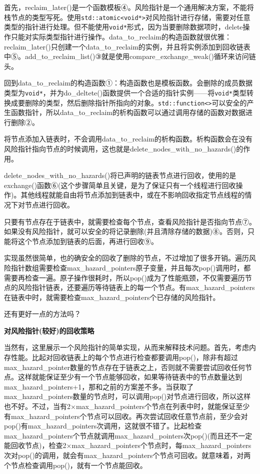 首先，reclaim\_later()是一个函数模板④。风险指针是一个通用解决方案，不能将栈节点的类型写死。使用\texttt{std::atomic<void*>}对风险指针进行存储，需要对任意类型的指针进行处理。但不能使用\texttt{void*}形式，因为当要删除数据项时，delete操作只能对实际类型指针进行操作。data\_to\_reclaim的构造函数就很优雅：reclaim\_later()只创建一个data\_to\_reclaim的实例，并且将实例添加到回收链表中⑤。add\_to\_reclaim\_list()③就是使用compare\_exchange\_weak()循环来访问链头。

回到data\_to\_reclaim的构造函数①：构造函数也是模板函数。会删除的成员数据类型为\texttt{void*}，并为do\_deltete()函数提供一个合适的指针实例——将\texttt{void*}类型转换成要删除的类型，然后删除指针所指向的对象。\texttt{std::function<>}可以安全的产生函数指针，所以data\_to\_reclaim的析构函数可以通过调用存储的函数对数据进行删除②。

将节点添加入链表时，不会调用data\_to\_reclaim的析构函数。析构函数会在没有风险指针指向节点的时候调用，这也就是delete\_nodes\_with\_no\_hazards()的作用。

delete\_nodes\_with\_no\_hazards()将已声明的链表节点进行回收，使用的是exchange()函数⑥(这个步骤简单且关键，是为了保证只有一个线程进行回收操作)。其他线程就能自由将节点添加到链表中，或在不影响回收指定节点线程的情况下对节点进行回收。

只要有节点存在于链表中，就需要检查每个节点，查看风险指针是否指向节点⑦。如果没有风险指针，就可以安全的将记录删除(并且清除存储的数据)⑧。否则，只能将这个节点添加到链表的后面，再进行回收⑨。

实现虽然很简单，也的确安全的回收了删除的节点，不过增加了很多开销。遍历风险指针数组需要检查max\_hazard\_pointers原子变量，并且每次pop()调用时，都需要再检查一遍。原子操作很耗时，所以pop()成为了性能瓶颈，不仅需要遍历节点的风险指针链表，还要遍历等待链表上的每一个节点。有max\_hazard\_pointers在链表中时，就需要检查max\_hazard\_pointers个已存储的风险指针。

还有更好一点的方法吗？

\textbf{对风险指针(较好)的回收策略}

当然有，这里展示一个风险指针的简单实现，从而来解释技术问题。首先，考虑内存性能。比起对回收链表上的每个节点进行检查都要调用pop()，除非有超过max\_hazard\_pointer数量的节点存在于链表之上，否则就不需要尝试回收任何节点。这样就能保证至少有一个节点能够回收，如果等待链表中的节点数量达到max\_hazard\_pointers+1，那和之前的方案差不多。当获取了max\_hazard\_pointers数量的节点时，可以调用pop()对节点进行回收，所以这样也不好。不过，当有2×max\_hazard\_pointers个节点在列表中时，就能保证至少有max\_hazard\_pointers个节点可以回收。再次尝试回收任意节点前，至少会对pop()有max\_hazard\_pointers次调用，这就很不错了。比起检查max\_hazard\_pointers个节点就调用max\_hazard\_pointers次pop()(而且还不一定能回收节点)，检查2×max\_hazard\_pointers个节点时，每max\_hazard\_pointers次对pop()的调用，就会有max\_hazard\_pointers个节点可回收。就意味着，对两个节点检查调用pop()，就有一个节点能回收。

